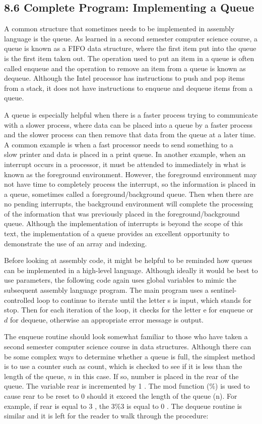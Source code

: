 \documentclass[10pt]{article}
\begin{document}
\subsection*{8.6 Complete Program: Implementing a Queue}
A common structure that sometimes needs to be implemented in assembly language is the queue. As learned in a second semester computer science course, a queue is known as a FIFO data structure, where the first item put into the queue is the first item taken out. The operation used to put an item in a queue is often called enqueue and the operation to remove an item from a queue is known as dequeue. Although the Intel processor has instructions to push and pop items from a stack, it does not have instructions to enqueue and dequeue items from a queue.

A queue is especially helpful when there is a faster process trying to communicate with a slower process, where data can be placed into a queue by a faster process and the slower process can then remove that data from the queue at a later time. A common example is when a fast processor needs to send something to a\\
slow printer and data is placed in a print queue. In another example, when an interrupt occurs in a processor, it must be attended to immediately in what is known as the foreground environment. However, the foreground environment may not have time to completely process the interrupt, so the information is placed in a queue, sometimes called a foreground/background queue. Then when there are no pending interrupts, the background environment will complete the processing of the information that was previously placed in the foreground/background queue. Although the implementation of interrupts is beyond the scope of this text, the implementation of a queue provides an excellent opportunity to demonstrate the use of an array and indexing.

Before looking at assembly code, it might be helpful to be reminded how queues can be implemented in a high-level language. Although ideally it would be best to use parameters, the following code again uses global variables to mimic the subsequent assembly language program. The main program uses a sentinel-controlled loop to continue to iterate until the letter s is input, which stands for stop. Then for each iteration of the loop, it checks for the letter e for enqueue or $d$ for dequeue, otherwise an appropriate error message is output.

The enqueue routine should look somewhat familiar to those who have taken a second semester computer science course in data structures. Although there can be some complex ways to determine whether a queue is full, the simplest method is to use a counter such as count, which is checked to see if it is less than the length of the queue, $n$ in this case. If so, number is placed in the rear of the queue. The variable rear is incremented by 1 . The mod function (\%) is used to cause rear to be reset to 0 should it exceed the length of the queue (n). For example, if rear is equal to 3 , the $3 \% 3$ is equal to 0 . The dequeue routine is similar and it is left for the reader to walk through the procedure:
\end{document}
